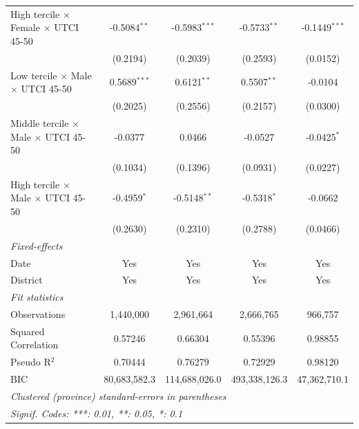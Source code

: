 \begin{table}[htbp]
\begin{tabular}{lcccc}
      High tercile $\times$ Female $\times$ UTCI 45-50     & -0.5084$^{**}$  & -0.5983$^{***}$     & -0.5733$^{**}$    & -0.1449$^{***}$\\   
                                                           & (0.2194)        & (0.2039)            & (0.2593)          & (0.0152)\\   
      Low tercile $\times$ Male $\times$ UTCI 45-50        & 0.5689$^{***}$  & 0.6121$^{**}$       & 0.5507$^{**}$     & -0.0104\\   
                                                           & (0.2025)        & (0.2556)            & (0.2157)          & (0.0300)\\   
      Middle tercile $\times$ Male $\times$ UTCI 45-50     & -0.0377         & 0.0466              & -0.0527           & -0.0425$^{*}$\\   
                                                           & (0.1034)        & (0.1396)            & (0.0931)          & (0.0227)\\   
      High tercile $\times$ Male $\times$ UTCI 45-50       & -0.4959$^{*}$   & -0.5148$^{**}$      & -0.5318$^{*}$     & -0.0662\\   
                                                           & (0.2630)        & (0.2310)            & (0.2788)          & (0.0466)\\   
      \midrule
      \emph{Fixed-effects}\\
      Date                                                 & Yes             & Yes                 & Yes               & Yes\\  
      District                                             & Yes             & Yes                 & Yes               & Yes\\  
      \midrule
      \emph{Fit statistics}\\
      Observations                                         & 1,440,000       & 2,961,664           & 2,666,765         & 966,757\\  
      Squared Correlation                                  & 0.57246         & 0.66304             & 0.55396           & 0.98855\\  
      Pseudo R$^2$                                         & 0.70444         & 0.76279             & 0.72929           & 0.98120\\  
      BIC                                                  & 80,683,582.3    & 114,688,026.0       & 493,338,126.3     & 47,362,710.1\\  
      \midrule \midrule
      \multicolumn{5}{l}{\emph{Clustered (province) standard-errors in parentheses}}\\
      \multicolumn{5}{l}{\emph{Signif. Codes: ***: 0.01, **: 0.05, *: 0.1}}\\
   \end{tabular}
\end{table}


